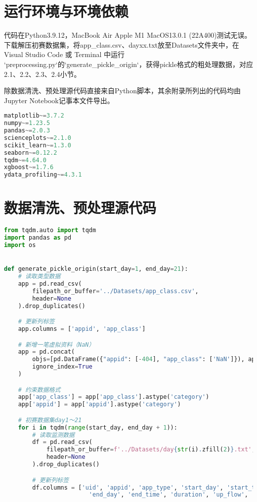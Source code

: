 \documentclass[withoutpreface,bwprint]{cumcmthesis}
\begin{document}
\newpage
\begin{appendices}

    \section{运行环境与环境依赖}
    代码在Python3.9.12，MacBook Air Apple M1 MacOS13.0.1 (22A400)测试无误。下载解压初赛数据集，将app\_class.csv、dayxx.txt放至Datasets文件夹中，在Visual Studio Code 或 Terminal 中运行 `preprocessing.py`的`generate\_pickle\_origin`，获得pickle格式的粗处理数据，对应2.1、2.2、2.3、2.4小节。

    除数据清洗、预处理源代码直接来自Python脚本，其余附录所列出的代码均由Jupyter Notebook记事本文件导出。
    \begin{lstlisting}[language=Python]
matplotlib~=3.7.2
numpy~=1.23.5
pandas~=2.0.3
scienceplots~=2.1.0
scikit_learn~=1.3.0
seaborn~=0.12.2
tqdm~=4.64.0
xgboost~=1.7.6
ydata_profiling~=4.3.1
    \end{lstlisting}

    \section{数据清洗、预处理源代码}
    \begin{lstlisting}[language=Python]
from tqdm.auto import tqdm
import pandas as pd
import os


def generate_pickle_origin(start_day=1, end_day=21):
    # 读取类型数据
    app = pd.read_csv(
        filepath_or_buffer='../Datasets/app_class.csv',
        header=None
    ).drop_duplicates()

    # 更新列标签
    app.columns = ['appid', 'app_class']

    # 新增一笔虚拟资料（NaN）
    app = pd.concat(
        objs=[pd.DataFrame({"appid": [-404], "app_class": ['NaN']}), app],
        ignore_index=True
    )

    # 约束数据格式
    app['app_class'] = app['app_class'].astype('category')
    app['appid'] = app['appid'].astype('category')

    # 初赛数据集day1～21
    for i in tqdm(range(start_day, end_day + 1)):
        # 读取监测数据
        df = pd.read_csv(
            filepath_or_buffer=f'../Datasets/day{str(i).zfill(2)}.txt',
            header=None
        ).drop_duplicates()

        # 更新列标签
        df.columns = ['uid', 'appid', 'app_type', 'start_day', 'start_time',
                        'end_day', 'end_time', 'duration', 'up_flow', 'down_flow']


\end{lstlisting}
\end{appendices}
\end{document}
